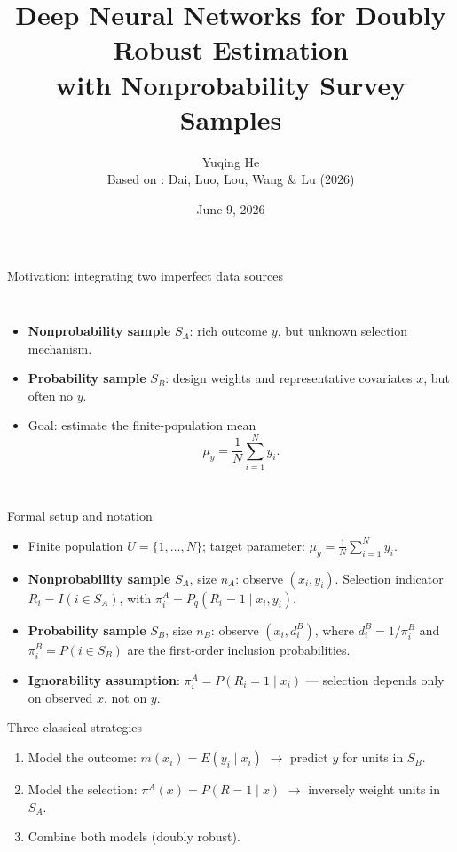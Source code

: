 \documentclass[aspectratio=169,11pt]{beamer}
\title[Deep DR Estimation]{Deep Neural Networks for Doubly Robust Estimation\\with Nonprobability Survey Samples}
\author[Yuqing He]{Yuqing He \\ \small Based on : Dai, Luo, Lou, Wang \& Lu (2026)}
\date{June 9, 2026}
\begin{document}
\begin{frame}
  \titlepage
\end{frame}
\begin{frame}{Motivation: integrating two imperfect data sources}
\begin{columns}[T]
\begin{itemize}
  \item \textbf{Nonprobability sample} $S_A$: rich outcome $y$, but unknown selection mechanism.
  \item \textbf{Probability sample} $S_B$: design weights and representative covariates $x$, but often no $y$.
  \item Goal: estimate the finite-population mean
  \[
    \mu_y=\frac{1}{N}\sum_{i=1}^N y_i.
  \]
\end{itemize}
\centering
{}
\end{columns}
\end{frame}

\begin{frame}{Formal setup and notation}
\begin{itemize}
  \item Finite population $U=\{1,\ldots,N\}$; target parameter:
  $\mu_y=\frac{1}{N}\sum_{i=1}^N y_i.$
  \item \textbf{Nonprobability sample} $S_A$, size $n_A$: observe $(x_i,y_i)$. Selection indicator $R_i=I(i\in S_A)$, with $\pi_i^A=P_q(R_i=1\mid x_i,y_i)$.
  \item \textbf{Probability sample} $S_B$, size $n_B$: observe $(x_i,d_i^B)$, where $d_i^B=1/\pi_i^B$ and $\pi_i^B=P(i\in S_B)$ are the first-order inclusion probabilities.
  \item \textbf{Ignorability assumption}: $\pi_i^A=P(R_i=1\mid x_i)$ — selection depends only on observed $x$, not on $y$.
\end{itemize}
\begin{block}{Three classical strategies}
\begin{enumerate}
  \item Model the outcome: $m(x_i)=E(y_i\mid x_i)$ $\rightarrow$ predict $y$ for units in $S_B$.
  \item Model the selection: $\pi^A(x)=P(R=1\mid x)$ $\rightarrow$ inversely weight units in $S_A$.
  \item Combine both models (doubly robust).
\end{enumerate}
\end{block}
\end{frame}
\end{document}
